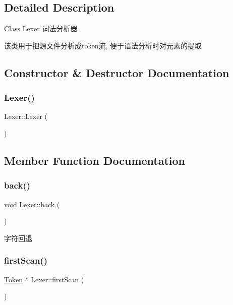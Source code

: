 \subsection{Detailed Description}
Class \hyperlink{class_lexer}{Lexer} 词法分析器 

该类用于把源文件分析成token流, 便于语法分析时对元素的提取 

\subsection{Constructor \& Destructor Documentation}
\mbox{\label{class_lexer_a2752a2b16cc1ffbcb8fc3e82e95bf331}} 
\subsubsection{\texorpdfstring{Lexer()}{Lexer()}}
{\footnotesize\ttfamily Lexer\+::\+Lexer (\begin{DoxyParamCaption}{ }\end{DoxyParamCaption})}



\subsection{Member Function Documentation}
\mbox{\label{class_lexer_ae28380e5c67144a1aeaf37f33ab11fb2}} 
\subsubsection{\texorpdfstring{back()}{back()}}
{\footnotesize\ttfamily void Lexer\+::back (\begin{DoxyParamCaption}{ }\end{DoxyParamCaption})}



字符回退 

\mbox{\label{class_lexer_aa5f52af80cfc8de7841d2ac6bc736662}} 
\subsubsection{\texorpdfstring{first\+Scan()}{firstScan()}}
{\footnotesize\ttfamily \hyperlink{class_token}{Token} $\ast$ Lexer\+::first\+Scan (\begin{DoxyParamCaption}{ }\end{DoxyParamCaption})\hspace{0.3cm}{\ttfamily [private]}}


